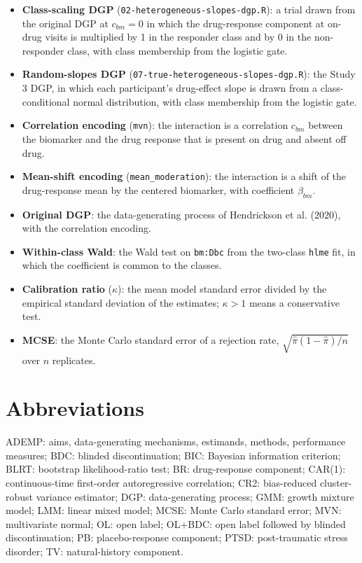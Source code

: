 \documentclass[
  11pt,
]{article}
\begin{document}
\begin{itemize}
  as computed in the \texttt{hlme} wrapper; 1 means perfectly separated
  classes.
\item
  \textbf{Class-scaling DGP} (\texttt{02-heterogeneous-slopes-dgp.R}): a trial
  drawn from the original DGP at \(c_{bm} = 0\) in which the
  drug-response component at on-drug visits is multiplied by 1 in the
  responder class and by 0 in the non-responder class, with class
  membership from the logistic gate.
\item
  \textbf{Random-slopes DGP} (\texttt{07-true-heterogeneous-slopes-dgp.R}): the
  Study 3 DGP, in which each participant's drug-effect slope is drawn
  from a class-conditional normal distribution, with class membership
  from the logistic gate.
\item
  \textbf{Correlation encoding} (\texttt{mvn}): the interaction is a correlation
  \(c_{bm}\) between the biomarker and the drug response that is present
  on drug and absent off drug.
\item
  \textbf{Mean-shift encoding} (\texttt{mean\_moderation}): the interaction is a
  shift of the drug-response mean by the centered biomarker, with
  coefficient \(\beta_{bm}\).
\item
  \textbf{Original DGP}: the data-generating process of Hendrickson et al.
  (2020), with the correlation encoding.
\item
  \textbf{Within-class Wald}: the Wald test on \texttt{bm:Dbc} from the two-class
  \texttt{hlme} fit, in which the coefficient is common to the classes.
\item
  \textbf{Calibration ratio} (\(\kappa\)): the mean model standard error
  divided by the empirical standard deviation of the estimates;
  \(\kappa > 1\) means a conservative test.
\item
  \textbf{MCSE}: the Monte Carlo standard error of a rejection rate,
  \(\sqrt{\hat\pi(1-\hat\pi)/n}\) over \(n\) replicates.
\end{itemize}

\section*{Abbreviations}\label{abbreviations}

ADEMP: aims, data-generating mechanisms, estimands, methods,
performance measures; BDC: blinded discontinuation; BIC: Bayesian
information criterion; BLRT: bootstrap likelihood-ratio test; BR:
drug-response component; CAR(1): continuous-time first-order
autoregressive correlation; CR2: bias-reduced cluster-robust variance
estimator; DGP: data-generating process; GMM: growth mixture model;
LMM: linear mixed model; MCSE: Monte Carlo standard error; MVN:
multivariate normal; OL: open label; OL+BDC: open label followed by
blinded discontinuation; PB: placebo-response component; PTSD:
post-traumatic stress disorder; TV: natural-history component.
\end{document}
